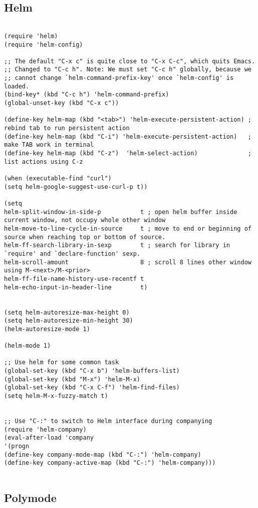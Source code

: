 \documentclass[11pt]{article}
\begin{document}
\subsection{Helm}
\label{sec:orgbbcdd10}
\begin{verbatim}

(require 'helm)
(require 'helm-config)

;; The default "C-x c" is quite close to "C-x C-c", which quits Emacs.
;; Changed to "C-c h". Note: We must set "C-c h" globally, because we
;; cannot change `helm-command-prefix-key' once `helm-config' is loaded.
(bind-key* (kbd "C-c h") 'helm-command-prefix)
(global-unset-key (kbd "C-x c"))

(define-key helm-map (kbd "<tab>") 'helm-execute-persistent-action) ; rebind tab to run persistent action
(define-key helm-map (kbd "C-i") 'helm-execute-persistent-action)   ; make TAB work in terminal
(define-key helm-map (kbd "C-z")  'helm-select-action)              ; list actions using C-z

(when (executable-find "curl")
(setq helm-google-suggest-use-curl-p t))

(setq 
helm-split-window-in-side-p           t ; open helm buffer inside current window, not occupy whole other window
helm-move-to-line-cycle-in-source     t ; move to end or beginning of source when reaching top or bottom of source.
helm-ff-search-library-in-sexp        t ; search for library in `require' and `declare-function' sexp.
helm-scroll-amount                    8 ; scroll 8 lines other window using M-<next>/M-<prior>
helm-ff-file-name-history-use-recentf t
helm-echo-input-in-header-line        t)


(setq helm-autoresize-max-height 0)
(setq helm-autoresize-min-height 30)
(helm-autoresize-mode 1)

(helm-mode 1)

;; Use helm for some common task
(global-set-key (kbd "C-x b") 'helm-buffers-list)
(global-set-key (kbd "M-x") 'helm-M-x)
(global-set-key (kbd "C-x C-f") 'helm-find-files)
(setq helm-M-x-fuzzy-match t)


;; Use "C-:" to switch to Helm interface during companying
(require 'helm-company)
(eval-after-load 'company
'(progn
(define-key company-mode-map (kbd "C-:") 'helm-company)
(define-key company-active-map (kbd "C-:") 'helm-company))) 


\end{verbatim}

\subsection{Polymode}
\label{sec:orgdcd692d}
\end{document}
